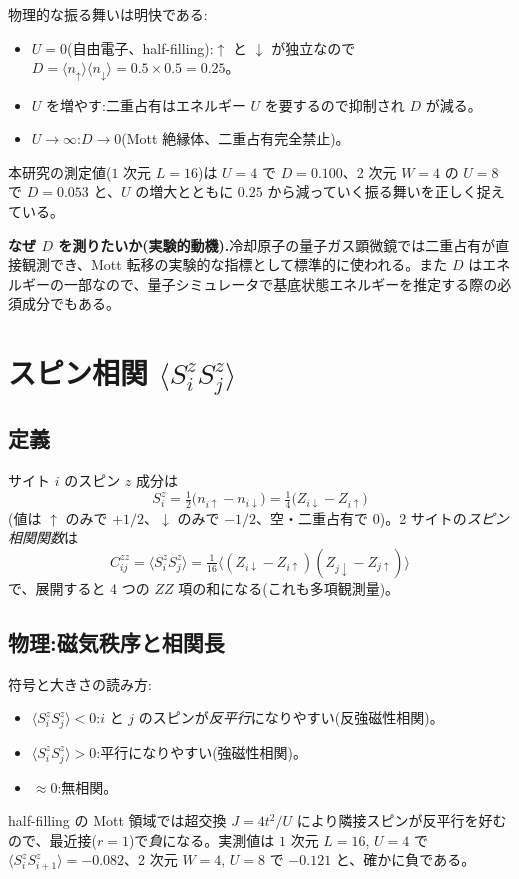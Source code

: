 \documentclass[11pt,a4paper]{ltjsarticle}
\newcommand{\ev}[1]{\langle #1\rangle}
\newcommand{\up}{\uparrow}
\newcommand{\dn}{\downarrow}
\begin{document}
物理的な振る舞いは明快である:
\begin{itemize}
  \item $U=0$(自由電子、half-filling):$\up$ と $\dn$ が独立なので $D = \ev{n_\up}\ev{n_\dn} = 0.5\times0.5 = 0.25$。
  \item $U$ を増やす:二重占有はエネルギー $U$ を要するので抑制され $D$ が減る。
  \item $U\to\infty$:$D\to0$(Mott 絶縁体、二重占有完全禁止)。
\end{itemize}
本研究の測定値($1$ 次元 $L=16$)は $U=4$ で $D=0.100$、2 次元 $W=4$ の $U=8$ で $D=0.053$ と、$U$ の増大とともに $0.25$ から減っていく振る舞いを正しく捉えている。

\begin{keybox}
\textbf{なぜ $D$ を測りたいか(実験的動機).}冷却原子の量子ガス顕微鏡では二重占有が直接観測でき、Mott 転移の実験的な指標として標準的に使われる。また $D$ はエネルギーの一部なので、量子シミュレータで基底状態エネルギーを推定する際の必須成分でもある。
\end{keybox}

\section{スピン相関 $\ev{S^z_iS^z_j}$}
\label{sec:szsz}

\subsection{定義}
サイト $i$ のスピン $z$ 成分は
\begin{equation}
  S^z_i = \tfrac12\bigl(n_{i\up}-n_{i\dn}\bigr)
  = \tfrac14\bigl(Z_{i\dn}-Z_{i\up}\bigr)
\end{equation}
(値は $\up$ のみで $+1/2$、$\dn$ のみで $-1/2$、空・二重占有で $0$)。2 サイトの\emph{スピン相関関数}は
\begin{equation}
  C^{zz}_{ij} = \ev{S^z_i S^z_j}
  = \tfrac1{16}\bigl\langle (Z_{i\dn}-Z_{i\up})(Z_{j\dn}-Z_{j\up})\bigr\rangle
\end{equation}
で、展開すると 4 つの $ZZ$ 項の和になる(これも多項観測量)。

\subsection{物理:磁気秩序と相関長}
符号と大きさの読み方:
\begin{itemize}
  \item $\ev{S^z_iS^z_j} < 0$:$i$ と $j$ のスピンが\emph{反平行}になりやすい(反強磁性相関)。
  \item $\ev{S^z_iS^z_j} > 0$:平行になりやすい(強磁性相関)。
  \item $\approx 0$:無相関。
\end{itemize}
half-filling の Mott 領域では超交換 $J=4t^2/U$ により隣接スピンが反平行を好むので、最近接($r=1$)で\emph{負}になる。実測値は $1$ 次元 $L=16$, $U=4$ で $\ev{S^z_iS^z_{i+1}}=-0.082$、2 次元 $W=4$, $U=8$ で $-0.121$ と、確かに負である。
\end{document}
